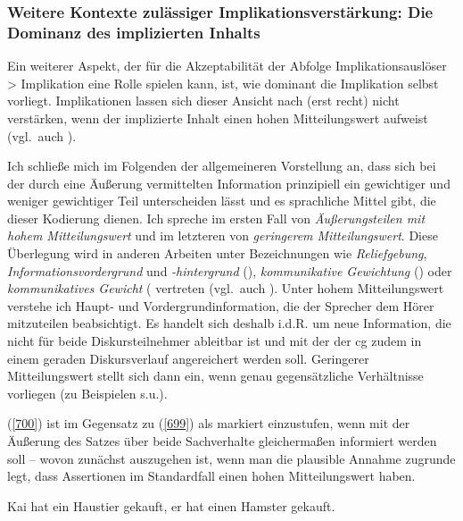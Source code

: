 \subsubsection{Weitere Kontexte zulässiger Implikationsverstärkung: Die Dominanz des implizierten Inhalts}\label{sec:weiterekon}
Ein weiterer Aspekt, der für die Akzeptabilität der Abfolge Implikationsauslöser > Implikation eine Rolle spielen kann, ist, wie dominant die Implikation selbst vorliegt. Implikationen lassen sich dieser Ansicht nach (erst recht) nicht verstärken, wenn der implizierte Inhalt einen hohen Mitteilungswert aufweist (vgl.\ auch \citealt[165--166]{Mueller2016a}).
	
Ich schließe mich im Folgenden der allgemeineren Vorstellung an, dass sich bei der durch eine Äußerung vermittelten Information prinzipiell ein gewichtiger und weniger gewichtiger Teil unterscheiden lässt und es sprachliche Mittel gibt, die dieser Kodierung dienen. Ich spreche im ersten Fall von \textit{Äußerungsteilen mit hohem Mitteilungswert} und im letzteren von \textit{geringerem Mitteilungswert}. Diese Überlegung wird in anderen Arbeiten unter  Bezeichnungen wie  \textit{Reliefgebung}, \textit{Informationsvordergrund} und \textit{-hintergrund} (\citealt{Hartmann1984}), \textit{kommunikative Gewichtung} (\citealt{Brandt1994}) oder \textit{kommunikatives Gewicht} (\citealt{Hoffmann2002, Hoffmann2003} vertreten (vgl.\ auch \citealt{Reis1993}). Unter hohem Mitteilungswert verstehe ich Haupt- und Vordergrundinformation, die der Sprecher dem Hörer mitzuteilen beabsichtigt. Es handelt sich deshalb i.d.R. um neue Information, die nicht für beide Diskursteilnehmer ableitbar ist und mit der der cg zudem in einem geraden Diskursverlauf angereichert werden soll. Geringerer Mitteilungswert stellt sich dann ein, wenn genau gegensätzliche Verhältnisse vorliegen (zu Beispielen s.u.).

(\ref{700}) ist im Gegensatz zu (\ref{699}) als markiert einzustufen, wenn mit der Äußerung des Satzes über beide Sachverhalte gleichermaßen informiert werden soll – wovon zunächst auszugehen ist, wenn man die plausible Annahme zugrunde legt, dass Assertionen  im Standardfall einen hohen Mitteilungswert haben.

\begin{exe}
	\ex\label{699} 
	Kai hat ein Haustier gekauft, er hat einen Hamster gekauft.	
\end{exe}

